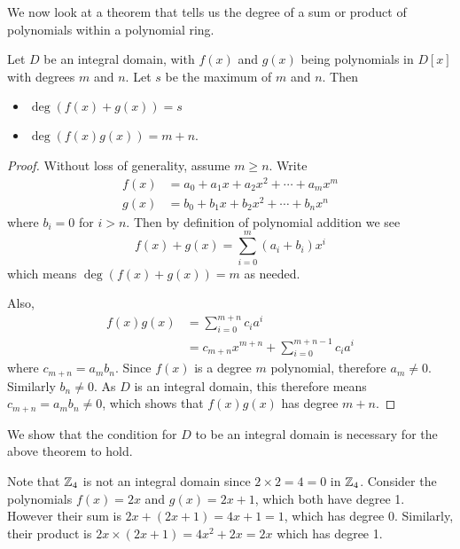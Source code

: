 We now look at a theorem that tells us the degree of a sum or product of polynomials within a polynomial ring.
\begin{theorem}\label{thrm-polynomial-degree-properties}
    Let $D$ be an integral domain, with $f(x)$ and $g(x)$ being polynomials in $D[x]$ with degrees $m$ and $n$. Let $s$ be the maximum of $m$ and $n$. Then
    \begin{itemize}
        \item $\deg(f(x) + g(x)) = s$
        \item $\deg(f(x)g(x)) = m + n$.
    \end{itemize}
\end{theorem}
\begin{proof}
    Without loss of generality, assume $m \geq n$. Write
    \begin{align*}
        f(x) &= a_0 + a_1x + a_2x^2 + \cdots + a_mx^m\\
        g(x) &= b_0 + b_1x + b_2x^2 + \cdots + b_nx^n
    \end{align*}
    where $b_i = 0$ for $i > n$. Then by definition of polynomial addition we see
    \[
        f(x) + g(x) = \sum_{i=0}^m(a_i+b_i)x^i
    \]
    which means $\deg(f(x) + g(x)) = m$ as needed.

    Also,
    \begin{align*}
        f(x)g(x) &= \sum_{i=0}^{m+n}c_ia^i\\
        &= c_{m+n}x^{m+n} + \sum_{i=0}^{m+n-1}c_ia^i
    \end{align*}
    where $c_{m+n} = a_mb_n$. Since $f(x)$ is a degree $m$ polynomial, therefore $a_m \neq 0$. Similarly $b_n \neq 0$. As $D$ is an integral domain, this therefore means $c_{m+n} = a_mb_n \neq 0$, which shows that $f(x)g(x)$ has degree $m + n$.
\end{proof}
\begin{example}
    We show that the condition for $D$ to be an integral domain is necessary for the above theorem to hold.

    Note that $\mathbb{Z}_4$ is not an integral domain since $2 \times 2 = 4 = 0$ in $\mathbb{Z}_4$. Consider the polynomials $f(x) = 2x$ and $g(x) = 2x + 1$, which both have degree 1. However their sum is $2x + (2x + 1) = 4x + 1= 1$, which has degree 0. Similarly, their product is $2x \times (2x+1) = 4x^2 + 2x = 2x$ which has degree 1.
\end{example}

